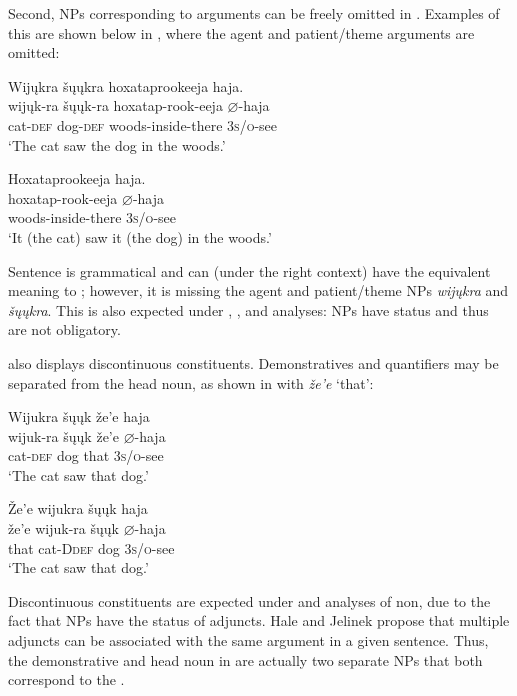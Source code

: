 \documentclass[output=paper]{LSP/langsci}
\begin{document}
Second, NPs corresponding to arguments can be freely omitted in . Examples of this are shown below in , where the agent and patient/theme arguments are omitted:

\ea\label{ex:jrs:14}
\ea \label{ex:jrs:14a} 
\glll Wij\k{u}kra	\v{s}\k{u}\k{u}kra		hoxataprookeeja 		haja.\\
wij\k{u}k-ra	\v{s}\k{u}\k{u}k-ra	hoxatap-rook-eeja 	$\varnothing$-haja \\
	cat-\textsc{def} 	dog-\textsc{def} 	woods-inside-there 	\textsc{3s/o}-see \\
\trans `The cat saw the dog in the woods.'

\ex \label{ex:jrs:14b}
\glll Hoxataprookeeja haja. \\
hoxatap-rook-eeja 	$\varnothing$-haja \\
woods-inside-there \textsc{3s/o}-see \\
\trans `It (the cat) saw it (the dog) in the woods.'
\z 
\z 

Sentence  is grammatical and can (under the right  context) have the equivalent meaning to ; however, it is missing the agent and patient/theme NPs \textit{wij\k{u}kra} and \textit{\v{s}\k{u}\k{u}kra}. This is also expected under , , and  analyses: NPs have  status and thus are not obligatory.

 also displays discontinuous constituents. Demonstratives and quantifiers may be separated from the head noun, as shown in  with \textit{\v{z}e'e} `that': 

\ea\label{ex:jrs:15}
\ea \label{ex:jrs:15a}
\glll Wijukra	\v{s}\k{u}\k{u}k	\v{z}e'e	haja \\
wijuk-ra	\v{s}\k{u}\k{u}k	\v{z}e'e	$\varnothing$-haja \\
	cat-\textsc{def} 	dog	that		\textsc{3s/o}-see\\
\trans `The cat saw that dog.' 

\ex \label{ex:jrs:15b}
\glll \v{Z}e'e	wijukra	 \v{s}\k{u}\k{u}k	haja \\
\v{z}e'e	wijuk-ra	\v{s}\k{u}\k{u}k	$\varnothing$-haja \\
that cat-D\textsc{def} dog \textsc{3s/o}-see \\
\trans `The cat saw that dog.'
\z 
\z 

Discontinuous constituents are expected under  and  analyses of non, due to the fact that NPs have the status of adjuncts. Hale and Jelinek propose that multiple adjuncts can be associated with the same argument in a given sentence. Thus, the demonstrative and head noun in  are actually two separate NPs that both correspond to the .
\end{document}
